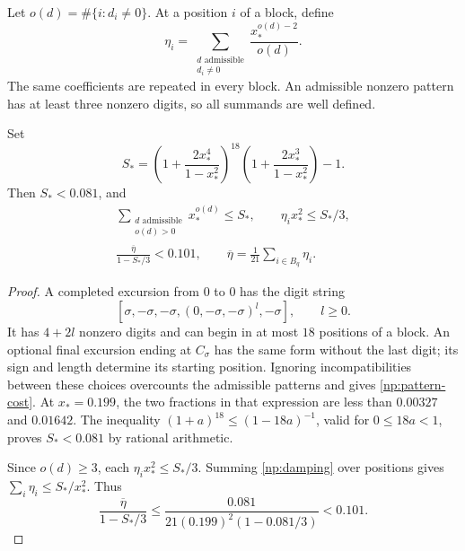 Let \(o(d)=\#\{i:d_i\ne0\}\). At a position \(i\) of a block, define
\begin{equation}
 \eta_i=\sum_{\substack{d\text{ admissible}\\d_i\ne0}}
                  \frac{x_*^{o(d)-2}}{o(d)}.
 \label{np:damping}
\end{equation}
The same coefficients are repeated in every block. An admissible nonzero
pattern has at least three nonzero digits, so all summands are well defined.

\begin{lemma}\label{np:damping-bounds}
Set
\begin{equation}
 S_*=\left(1+\frac{2x_*^4}{1-x_*^2}\right)^{18}
       \left(1+\frac{2x_*^3}{1-x_*^2}\right)-1.
 \label{np:pattern-cost}
\end{equation}
Then \(S_*<0.081\), and
\begin{equation}
 \begin{gathered}
 \sum_{\substack{d\text{ admissible}\\o(d)>0}}x_*^{o(d)}\le S_*,
 \qquad \eta_i x_*^2\le S_*/3,\\
 \frac{\overline\eta}{1-S_*/3}<0.101,
 \qquad \overline\eta=\frac1{21}\sum_{i\in B_q}\eta_i.
 \end{gathered}
 \label{np:damping-estimates}
\end{equation}
\end{lemma}

\begin{proof}
A completed excursion from \(0\) to \(0\) has the digit string
\[
 [\sigma,-\sigma,-\sigma,(0,-\sigma,-\sigma)^l,-\sigma],
 \qquad l\ge0.
\]
It has \(4+2l\) nonzero digits and can begin in at most \(18\) positions
of a block. An optional final excursion ending at \(C_\sigma\) has the
same form without the last digit; its sign and length determine its
starting position. Ignoring incompatibilities between these choices
overcounts the admissible patterns and gives \eqref{np:pattern-cost}.
At \(x_*=0.199\), the two fractions in that expression are less than
\(0.00327\) and \(0.01642\). The inequality
\((1+a)^{18}\le(1-18a)^{-1}\), valid for \(0\le18a<1\), proves
\(S_*<0.081\) by rational arithmetic.

Since \(o(d)\ge3\), each \(\eta_i x_*^2\le S_*/3\). Summing
\eqref{np:damping} over positions gives
\(\sum_i\eta_i\le S_*/x_*^2\). Thus
\[
 \frac{\overline\eta}{1-S_*/3}
 \le\frac{0.081}{21(0.199)^2(1-0.081/3)}<0.101.
\]
\end{proof}

